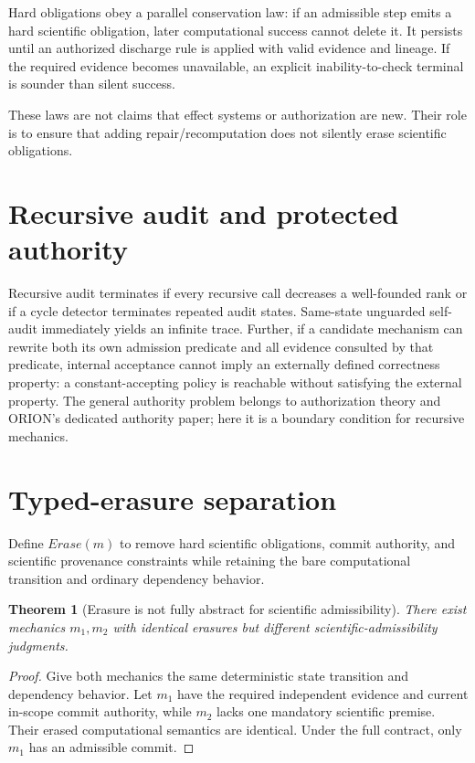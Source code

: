 \documentclass[11pt]{article}
\newtheorem{theorem}{Theorem}
\begin{document}
Hard obligations obey a parallel conservation law: if an admissible step emits a hard scientific obligation, later computational success cannot delete it. It persists until an authorized discharge rule is applied with valid evidence and lineage. If the required evidence becomes unavailable, an explicit inability-to-check terminal is sounder than silent success.

These laws are not claims that effect systems or authorization are new. Their role is to ensure that adding repair/recomputation does not silently erase scientific obligations.

\section{Recursive audit and protected authority}
Recursive audit terminates if every recursive call decreases a well-founded rank or if a cycle detector terminates repeated audit states. Same-state unguarded self-audit immediately yields an infinite trace. Further, if a candidate mechanism can rewrite both its own admission predicate and all evidence consulted by that predicate, internal acceptance cannot imply an externally defined correctness property: a constant-accepting policy is reachable without satisfying the external property. The general authority problem belongs to authorization theory and ORION's dedicated authority paper; here it is a boundary condition for recursive mechanics.

\section{Typed-erasure separation}
Define $Erase(m)$ to remove hard scientific obligations, commit authority, and scientific provenance constraints while retaining the bare computational transition and ordinary dependency behavior.

\begin{theorem}[Erasure is not fully abstract for scientific admissibility]
There exist mechanics $m_1,m_2$ with identical erasures but different scientific-admissibility judgments.
\end{theorem}
\begin{proof}
Give both mechanics the same deterministic state transition and dependency behavior. Let $m_1$ have the required independent evidence and current in-scope commit authority, while $m_2$ lacks one mandatory scientific premise. Their erased computational semantics are identical. Under the full contract, only $m_1$ has an admissible commit.
\end{proof}
\end{document}
